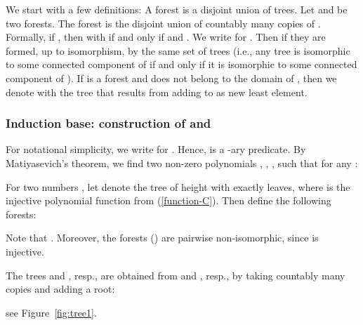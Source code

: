 \documentclass[envcountsame]{llncs}
\begin{document}
We start with a few definitions: 
A forest is a disjoint union of trees. 
Let  and  be two forests.
The forest  is the disjoint union of countably many copies
of . Formally, if , then 
with  if and only if  and . We write
 for .
Then  if they are formed, up to isomorphism, by
the same set of trees (i.e., any tree is isomorphic to some connected
component of  if and only if it is isomorphic to some connected component of
). 
If  is a forest and  does not belong to the domain of
, then we denote with  the tree that
results from adding  to  as new least element.

\subsubsection{Induction base: construction of  and
  }\label{sss:base}

For notational simplicity, we write  for . 
Hence,  is a -ary predicate. By
Matiyasevich's theorem, we find two non-zero polynomials
, , , such that for any :

For two numbers , let  denote the tree of height
 with exactly  leaves, where  is the injective polynomial function 
from (\ref{function-C}).  Then define the following forests:

Note that . Moreover, the forests 
() are pairwise non-isomorphic, since 
is injective.

The trees  and , resp.,
are obtained from  and , resp., by
taking countably many copies and adding a root:

see Figure~\ref{fig:tree1}.
\end{document}
